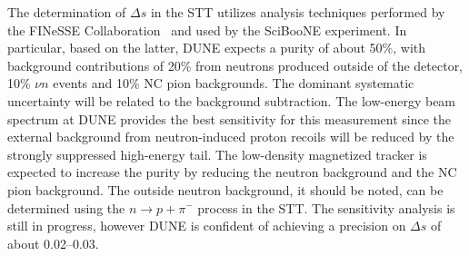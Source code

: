 \begin{table}[htb]
\centering
\caption[Expected proton range for the  low-density tracker]{Expected proton range for the  low-density
($\rho\sim$\SI{0.1}{\gram\per\cubic\centi\meter}) tracker. The first column gives the proton kinetic energy
and the last column the proton momentum. The $Q^2$ value producing $T_p$ is calculated
assuming the struck nucleon is initially at rest.}
\label{tab:prange}
\end{table}
The determination of $\Delta s$ in the STT %
utilizes
analysis techniques performed by the FINeSSE
Collaboration~\cite{Bugel:2004yk} and used by the SciBooNE experiment.  In
particular, based on the latter, DUNE
expects a purity of about 50\%, with background contributions of 20\%
from neutrons produced outside of the detector, 10\% $\nu n$ events
and 10\% NC pion backgrounds.  The dominant systematic uncertainty
will be related to the background subtraction.  The low-energy beam
spectrum at DUNE provides the best sensitivity for this measurement
since the external background from neutron-induced proton recoils will
be reduced by the strongly suppressed high-energy tail.  The
low-density magnetized tracker is expected to increase the purity by
reducing the neutron background and the NC pion background.  The
outside neutron background, it should be noted, can be determined
using the $n \rightarrow p + \pi^-$ process in the STT.  The
sensitivity analysis is still in progress, however DUNE is confident
of achieving a precision on $\Delta s$ of about \numrange[range-phrase
= --]{0.02}{0.03}.
 
\clearpage
